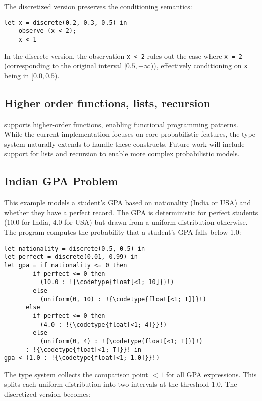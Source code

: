 \documentclass[acmsmall,screen,dvipsnames,x11names,nonacm,anonymous,review]{acmart}
\newcommand{\codetype}[1]{\textcolor{typecolor}{\ttfamily\small#1}}
\newcommand{\Slice}{\text{\scshape Slice}\xspace}
\begin{document}
\noindent The discretized version preserves the conditioning semantics:

\begin{lstlisting}[aboveskip=1em,belowskip=1em]
    let x = discrete(0.2, 0.3, 0.5) in
    observe (x < 2);
    x < 1
\end{lstlisting}

\noindent In the discrete version, the observation \texttt{x < 2} rules out the case where \texttt{x = 2} (corresponding to the original interval $[0.5, +\infty)$), effectively conditioning on \texttt{x} being in $[0.0, 0.5)$.

\subsection{Higher order functions, lists, recursion}

\Slice supports higher-order functions, enabling functional programming patterns. While the current implementation focuses on core probabilistic features, the type system naturally extends to handle these constructs. Future work will include support for lists and recursion to enable more complex probabilistic models.


\subsection{Indian GPA Problem}\label{sec:gpa}

This example models a student's GPA based on nationality (India or USA) and whether they have a perfect record. The GPA is deterministic for perfect students (10.0 for India, 4.0 for USA) but drawn from a uniform distribution otherwise. The program computes the probability that a student's GPA falls below 1.0:

\begin{lstlisting}[aboveskip=1em,belowskip=1em,escapechar=!]
let nationality = discrete(0.5, 0.5) in
let perfect = discrete(0.01, 0.99) in
let gpa = if nationality <= 0 then
        if perfect <= 0 then
          (10.0 : !{\codetype{float[<1; 10]}}!)
        else
          (uniform(0, 10) : !{\codetype{float[<1; T]}}!)
      else
        if perfect <= 0 then
          (4.0 : !{\codetype{float[<1; 4]}}!)
        else
          (uniform(0, 4) : !{\codetype{float[<1; T]}}!)
      : !{\codetype{float[<1; T]}}! in
gpa < (1.0 : !{\codetype{float[<1; 1.0]}}!)
\end{lstlisting}

\noindent The type system collects the comparison point $<1$ for all GPA expressions. This splits each uniform distribution into two intervals at the threshold 1.0. The discretized version becomes:
\end{document}
